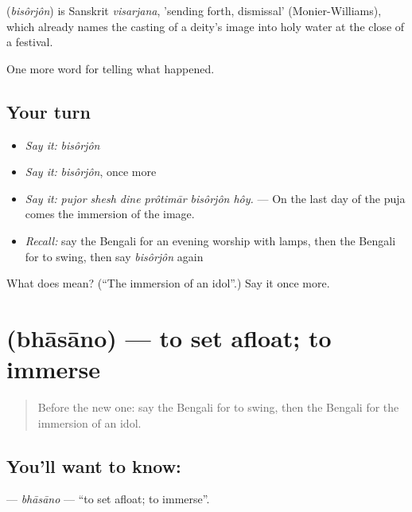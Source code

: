 \begin{cousinweb}
\textbf{} (\emph{bisôrjôn}) is Sanskrit \emph{visarjana}, 'sending forth, dismissal' (Monier-Williams), which already names the casting of a deity's image into holy water at the close of a festival.
\end{cousinweb}

\begin{grammarlens}[title={What you've built}]
One more word for telling what happened.
\end{grammarlens}

\subsection*{Your turn}
\begin{itemize}
\raggedright
  \item \emph{Say it:} \emph{bisôrjôn}
  \item \emph{Say it:} \emph{bisôrjôn}, once more
  \item \emph{Say it:} \emph{pujor shesh dine prôtimār bisôrjôn hôy.} — On the last day of the puja comes the immersion of the image.
  \item \emph{Recall:} say the Bengali for an evening worship with lamps, then the Bengali for to swing, then say \emph{bisôrjôn} again
\end{itemize}

\begin{tcolorbox}[breakable,colback=teal!4,colframe=teal!35!black,title={Before you move on}]
What does  mean? (\textquotedblleft{}The immersion of an idol\textquotedblright{}.) Say it once more.
\end{tcolorbox}
\section[\texorpdfstring{\bn{ভাসানো} (bhāsāno)}{ভাসানো (bhāsāno)}]{ (bhāsāno) — to set afloat; to immerse}

\label{lesson:BN-C308-bhasano}



\begin{quote}
Before the new one: say the Bengali for to swing, then the Bengali for the immersion of an idol.
\end{quote}

\subsection*{You'll want to know: }
\textbf{} — \emph{bhāsāno} — \textquotedblleft{}to set afloat; to immerse\textquotedblright{}.


